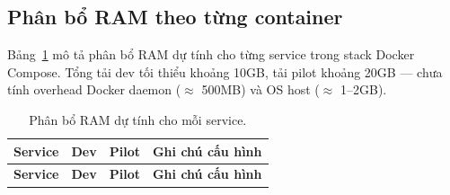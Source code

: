 \subsection{Phân bổ RAM theo từng container}
\label{subsec:ram-allocation}

Bảng~\ref{tab:ram-allocation} mô tả phân bổ RAM dự tính cho từng
service trong stack Docker Compose. Tổng tải dev tối thiểu khoảng
10GB, tải pilot khoảng 20GB --- chưa tính overhead Docker daemon
($\approx$ 500MB) và OS host ($\approx$ 1--2GB).

\begin{longtable}{|p{3.7cm}|p{1.5cm}|p{1.8cm}|p{6cm}|}
\caption{Phân bổ RAM dự tính cho mỗi service.}
\label{tab:ram-allocation} \\
\hline
\textbf{Service} & \textbf{Dev} & \textbf{Pilot} & \textbf{Ghi chú cấu hình} \\
\hline
\endfirsthead
\hline
\textbf{Service} & \textbf{Dev} & \textbf{Pilot} & \textbf{Ghi chú cấu hình} \\
\hline
\endhead


\end{longtable}
